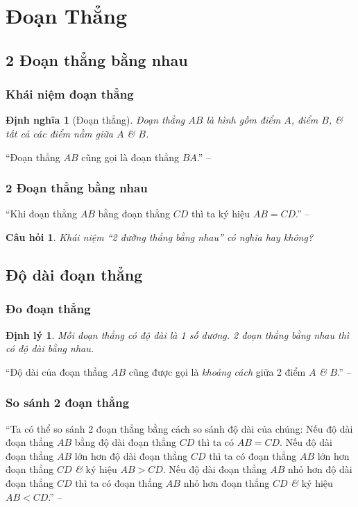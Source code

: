 \documentclass[oneside]{book}
\numberwithin{equation}{section}
\newtheorem{dinhnghia}{Định nghĩa}[section]
\newtheorem{cauhoi}{Câu hỏi}[section]
\newtheorem{dinhly}{Định lý}[section]
\begin{document}
\section{Đoạn Thẳng}

\subsection{2 Đoạn thẳng bằng nhau}

\subsubsection{Khái niệm đoạn thẳng}
\begin{dinhnghia}[Đoạn thẳng]
	\emph{Đoạn thẳng $AB$} là hình gồm điểm $A$, điểm $B$, \textit{\&} tất cả các điểm nằm giữa $A$ \textit{\&} $B$.
\end{dinhnghia}
``Đoạn thẳng $AB$ cũng gọi là đoạn thẳng $BA$.'' -- \cite[p. 84]{Thai_Anh_Dat_Ha_Loan_Nam_Quang_Toan_6_tap_2}

\subsubsection{2 Đoạn thẳng bằng nhau}
``Khi đoạn thẳng $AB$ bằng đoạn thẳng $CD$ thì ta ký hiệu $AB = CD$.'' -- \cite[p. 85]{Thai_Anh_Dat_Ha_Loan_Nam_Quang_Toan_6_tap_2}

\begin{cauhoi}
	Khái niệm ``2 đường thẳng bằng nhau'' có nghĩa hay không?
\end{cauhoi}

\subsection{Độ dài đoạn thẳng}

\subsubsection{Đo đoạn thẳng}
\begin{dinhly}
	Mỗi đoạn thẳng có độ dài là 1 số dương. 2 đoạn thẳng bằng nhau thì có độ dài bằng nhau.
\end{dinhly}
``Độ dài của đoạn thẳng $AB$ cũng được gọi là \textit{khoảng cách} giữa 2 điểm $A$ \textit{\&} $B$.'' -- \cite[p. 85]{Thai_Anh_Dat_Ha_Loan_Nam_Quang_Toan_6_tap_2}

\subsubsection{So sánh 2 đoạn thẳng}
``Ta có thể so sánh 2 đoạn thẳng bằng cách so sánh độ dài của chúng: Nếu độ dài đoạn thẳng $AB$ bằng độ dài đoạn thẳng $CD$ thì ta có $AB = CD$. Nếu độ dài đoạn thẳng $AB$ lớn hơn độ dài đoạn thẳng $CD$ thì ta có đoạn thẳng $AB$ lớn hơn đoạn thẳng $CD$ \textit{\&} ký hiệu $AB > CD$. Nếu độ dài đoạn thẳng $AB$ nhỏ hơn độ dài đoạn thẳng $CD$ thì ta có đoạn thẳng $AB$ nhỏ hơn đoạn thẳng $CD$ \textit{\&} ký hiệu $AB < CD$.'' -- \cite[p. 86]{Thai_Anh_Dat_Ha_Loan_Nam_Quang_Toan_6_tap_2}
\end{document}

